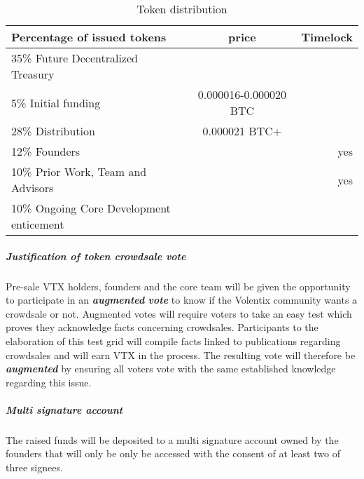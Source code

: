 \documentclass[]{article}
\begin{document}
\begin{table}[h!]
	\begin{center}
		\caption{Token distribution}
		\label{tab:table1}
		\begin{tabular}{l|c|r}
			\textbf{Percentage of issued tokens} & \textbf{price} & \textbf{Timelock} \\
		
			\hline
			35\% Future Decentralized Treasury & & \\
			\hline
			5\%  Initial funding & 0.000016-0.000020 BTC & \\
			\hline
			28\% Distribution & 0.000021 BTC+ & \\
			\hline
			12\% Founders &  & yes \\
			\hline
			10\% Prior Work, Team and Advisors & & yes\\
		
			\hline
			10\% Ongoing Core Development enticement & &\\
			\hline		
			
				
		\end{tabular}
	\end{center}


\end{table}

\subparagraph{Justification of token crowdsale vote}
Pre-sale VTX holders, founders and the core team will be given the opportunity to participate in an \textbf{\textit{augmented} \textit{vote}}\cite{21} 
to know if the Volentix community wants a crowdsale or not. 
Augmented votes will require voters to take an easy test which proves they acknowledge facts concerning crowdsales. 
Participants to the elaboration of this test grid will compile facts linked to publications regarding crowdsales and will earn VTX in the process. 
The resulting vote will therefore be \textit{\textbf{augmented}} by ensuring all voters vote with the same established knowledge regarding this issue.  

\subparagraph{Multi signature account}
The raised funds will be deposited to a multi signature account owned by the founders 
that will only be only be accessed with the consent of at least two of three signees.
\end{document}
